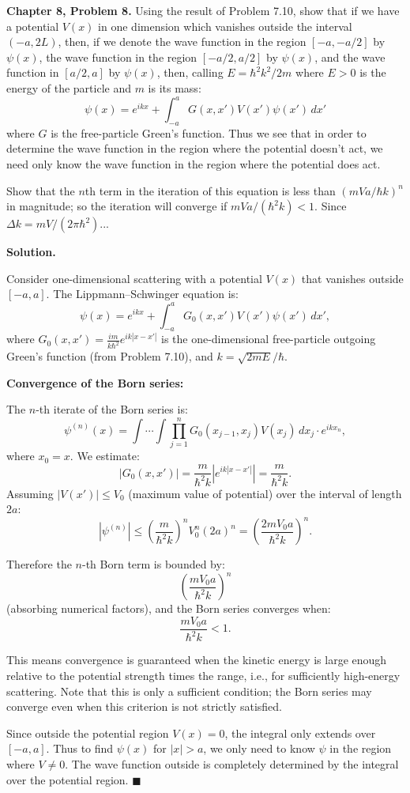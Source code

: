 \documentclass[12pt]{article}
\begin{document}
\textbf{Chapter 8, Problem 8.} Using the result of Problem 7.10, show that if we have a potential $V(x)$ in one dimension which vanishes outside the interval $(-a,2L)$, then, if we denote the wave function in the region $[-a,-a/2]$ by $\psi(x)$, the wave function in the region $[-a/2,a/2]$ by $\psi(x)$, and the wave function in $[a/2,a]$ by $\psi(x)$, then, calling $E = \hbar^2 k^2/2m$ where $E>0$ is the energy of the particle and $m$ is its mass:
\[
\psi(x) = e^{ikx} + \int_{-a}^{a} G(x,x')V(x')\psi(x')\,dx'
\]
where $G$ is the free-particle Green's function. Thus we see that in order to determine the wave function in the region where the potential doesn't act, we need only know the wave function in the region where the potential does act.

Show that the $n$th term in the iteration of this equation is less than $(mVa/\hbar k)^n$ in magnitude; so the iteration will converge if $mVa/(\hbar^2 k) < 1$. Since $\Delta k = mV/(2\pi\hbar^2)$...

\bigskip
\textbf{Solution.}

Consider one-dimensional scattering with a potential $V(x)$ that vanishes outside $[-a,a]$. The Lippmann--Schwinger equation is:
\[
\psi(x) = e^{ikx} + \int_{-a}^{a} G_0(x,x')V(x')\psi(x')\,dx',
\]
where $G_0(x,x') = \frac{im}{k\hbar^2}e^{ik|x-x'|}$ is the one-dimensional free-particle outgoing Green's function (from Problem 7.10), and $k = \sqrt{2mE}/\hbar$.

\textbf{Convergence of the Born series:}

The $n$-th iterate of the Born series is:
\[
\psi^{(n)}(x) = \int\cdots\int \prod_{j=1}^n G_0(x_{j-1},x_j)V(x_j)\,dx_j \cdot e^{ikx_n},
\]
where $x_0 = x$. We estimate:
\[
|G_0(x,x')| = \frac{m}{\hbar^2 k}|e^{ik|x-x'|}| = \frac{m}{\hbar^2 k}.
\]
Assuming $|V(x')|\le V_0$ (maximum value of potential) over the interval of length $2a$:
\[
|\psi^{(n)}| \le \left(\frac{m}{\hbar^2 k}\right)^n V_0^n (2a)^n = \left(\frac{2mV_0 a}{\hbar^2 k}\right)^n.
\]

Therefore the $n$-th Born term is bounded by:
\[
\left(\frac{mV_0 a}{\hbar^2 k}\right)^n
\]
(absorbing numerical factors), and the Born series converges when:
\[
\boxed{\frac{mV_0 a}{\hbar^2 k} < 1.}
\]

This means convergence is guaranteed when the kinetic energy is large enough relative to the potential strength times the range, i.e., for sufficiently high-energy scattering. Note that this is only a sufficient condition; the Born series may converge even when this criterion is not strictly satisfied.

Since outside the potential region $V(x)=0$, the integral only extends over $[-a,a]$. Thus to find $\psi(x)$ for $|x|>a$, we only need to know $\psi$ in the region where $V\ne 0$. The wave function outside is completely determined by the integral over the potential region. $\blacksquare$
\end{document}
